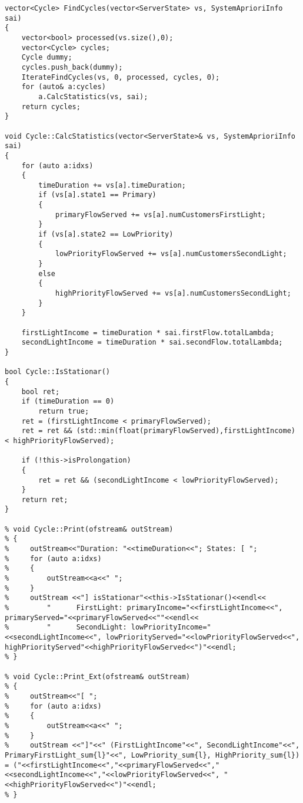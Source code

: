 \begin{lstlisting}[language={[ISO]C++}]
vector<Cycle> FindCycles(vector<ServerState> vs, SystemAprioriInfo sai)
{
    vector<bool> processed(vs.size(),0);
    vector<Cycle> cycles;
    Cycle dummy;
    cycles.push_back(dummy);
    IterateFindCycles(vs, 0, processed, cycles, 0);
    for (auto& a:cycles)
        a.CalcStatistics(vs, sai);
    return cycles;
}

void Cycle::CalcStatistics(vector<ServerState>& vs, SystemAprioriInfo sai)
{
    for (auto a:idxs)
    {
        timeDuration += vs[a].timeDuration;
        if (vs[a].state1 == Primary)
	    {
            primaryFlowServed += vs[a].numCustomersFirstLight;
	    }
        if (vs[a].state2 == LowPriority)
	    {
            lowPriorityFlowServed += vs[a].numCustomersSecondLight;
	    }
        else
	    {
            highPriorityFlowServed += vs[a].numCustomersSecondLight;
	    }
    }

    firstLightIncome = timeDuration * sai.firstFlow.totalLambda;
    secondLightIncome = timeDuration * sai.secondFlow.totalLambda;
}

bool Cycle::IsStationar()
{
    bool ret;
    if (timeDuration == 0)
        return true;
    ret = (firstLightIncome < primaryFlowServed);
    ret = ret && (std::min(float(primaryFlowServed),firstLightIncome) < highPriorityFlowServed);

    if (!this->isProlongation)
    {
        ret = ret && (secondLightIncome < lowPriorityFlowServed);
    }
    return ret;
}

% void Cycle::Print(ofstream& outStream)
% {
%     outStream<<"Duration: "<<timeDuration<<"; States: [ ";
%     for (auto a:idxs)
%     {
%         outStream<<a<<" ";
%     }
%     outStream <<"] isStationar"<<this->IsStationar()<<endl<<
%         "      FirstLight: primaryIncome="<<firstLightIncome<<", primaryServed="<<primaryFlowServed<<""<<endl<<
%         "      SecondLight: lowPriorityIncome="<<secondLightIncome<<", lowPriorityServed="<<lowPriorityFlowServed<<", highPriorityServed"<<highPriorityFlowServed<<")"<<endl;
% }

% void Cycle::Print_Ext(ofstream& outStream)
% {
%     outStream<<"[ ";
%     for (auto a:idxs)
%     {
%         outStream<<a<<" ";
%     }
%     outStream <<"]"<<" (FirstLightIncome"<<", SecondLightIncome"<<", PrimaryFirstLight_sum{l}"<<", LowPriority_sum{l}, HighPriority_sum{l}) = ("<<firstLightIncome<<","<<primaryFlowServed<<","<<secondLightIncome<<","<<lowPriorityFlowServed<<", "<<highPriorityFlowServed<<")"<<endl;
% }
    \end{lstlisting}




